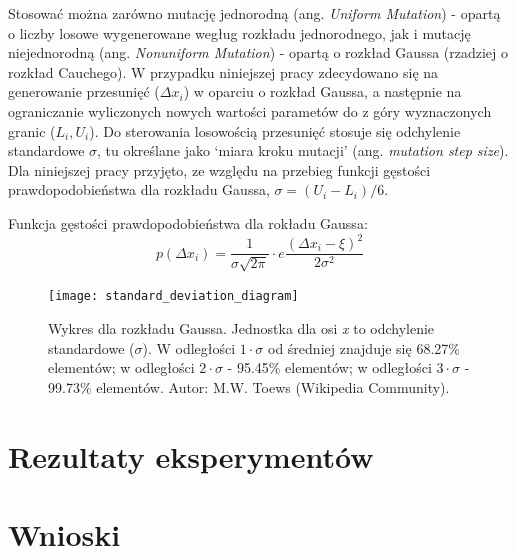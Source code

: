 \documentclass[a4paper,11pt]{article}
\begin{document}
    \bigskip

    Stosować można zarówno mutację jednorodną (ang. \textit{Uniform Mutation}) - opartą o liczby losowe wygenerowane wegług rozkładu jednorodnego, jak i mutację niejednorodną (ang. \textit{Nonuniform Mutation}) - opartą o rozkład Gaussa (rzadziej o rozkład Cauchego)\cite{IntroductionToEvolutionaryComputing2015}. W przypadku niniejszej pracy zdecydowano się na generowanie przesunięć ($\Delta x_{i}$) w oparciu o rozkład Gaussa, a następnie na ograniczanie wyliczonych nowych wartości parametów do z góry wyznaczonych granic ($L_{i}, U_{i}$). Do sterowania losowością przesunięć stosuje się odchylenie standardowe $\sigma$, tu określane jako `miara kroku mutacji' (ang. \textit{mutation step size}). Dla niniejszej pracy przyjęto, ze względu na przebieg funkcji gęstości prawdopodobieństwa dla rozkładu Gaussa, $\sigma = (U_{i} - L_{i}) / 6$.

    \bigskip

    Funkcja gęstości prawdopodobieństwa dla rokładu Gaussa: \\
    \begin{equation}
        \label{equ:mutation_probabily distribution}
        p(\Delta x_{i}) = \frac{1}{\sigma \sqrt {2 \pi}} \cdot e \frac{(\Delta x_{i} - \xi)^{2}}{2 \sigma^{2}}
    \end{equation}

    \bigskip

    \begin{figure}[H]
        \label{fig:standard_deviation_diagram}
        \centering
        \texttt{[image: standard\_deviation\_diagram]}
        \caption{Wykres dla rozkładu Gaussa. Jednostka dla osi \textit{x} to odchylenie standardowe ($\sigma$). W odległości $1 \cdot \sigma$ od średniej znajduje się 68.27\% elementów; w odległości $2 \cdot \sigma$ - 95.45\% elementów; w odległości $3 \cdot \sigma$ - 99.73\% elementów. Autor: M.W. Toews (Wikipedia Community).}
    \end{figure}


    \section{Rezultaty eksperymentów}


    \section{Wnioski}


    \printbibliography
\end{document}
